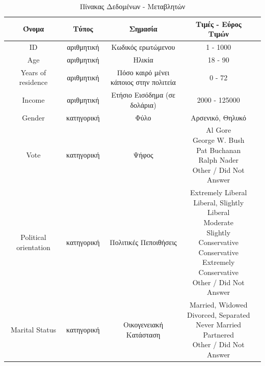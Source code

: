 \documentclass[10pt, letterpaper]{article}
\begin{document}
        \begin{center}
        \begin{table}[h!]
            \caption{Πίνακας Δεδομένων - Μεταβλητών}
            \label{summarytable}
            \begin{tabular}{||c|c|c|c|c||}
                \hline
                Όνομα & Τύπος & Σημασία & Τιμές - Εύρος Τιμών \\
                \hline
                ID & αριθμητική & Κωδικός ερωτώμενου & 1 - 1000 \\
                \hline
                Age & αριθμητική & Ηλικία & 18 - 90 \\
                \hline
                Years of residence & αριθμητική & \makecell{Πόσο καιρό μένει \\ κάποιος στην πολιτεία} & 0 - 72 \\
                \hline
                Income & αριθμητική & Ετήσιο Εισόδημα (σε δολάρια) & 2000 - 125000 \\
                \hline
                Gender & κατηγορική & Φύλο & Αρσενικό, Θηλυκό \\
                \hline
                Vote & κατηγορική & Ψήφος & \makecell{Al Gore \\ George W. Bush \\ Pat Buchanan \\ Ralph Nader \\ Other / Did Not Answer } \\
                \hline
                Political orientation & κατηγορική & Πολιτικές Πεποιθήσεις & \makecell{Extremely Liberal \\ Liberal, Slightly Liberal \\ Moderate \\ Slightly Conservative \\ Conservative \\ Extremely Conservative \\ Other / Did Not Answer }\\
                \hline
                Marital Status & κατηγορική & Οικογενειακή Κατάσταση & \makecell{Married, Widowed \\ Divorced, Separated \\ Never Married \\ Partnered \\ Other / Did Not Answer }\\
                \hline
            \end{tabular}
        \end{table}
        \end{center}
        
\end{document}
